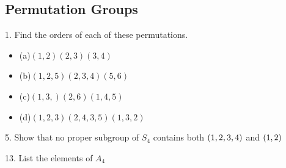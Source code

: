 \subsection{Permutation Groups}
\begin{mdframed}[style=darkQuesion]
  1. Find the orders of each of these permutations.
  \begin{itemize}
    \item []{(a)$(1,2)(2,3)(3,4)$}
    \item []{(b)$(1,2,5)(2,3,4)(5,6)$}
    \item []{(c)$(1,3,)(2,6)(1,4,5)$}
    \item []{(d)$(1,2,3)(2,4,3,5)(1,3,2)$}
  \end{itemize}
\end{mdframed}
\begin{mdframed}[style=darkAnswer,frametitle={Joe Starr}]
\end{mdframed}
\newpage
\begin{mdframed}[style=darkQuesion]
  5. Show that no proper subgroup of $S_4$ contains both $\left(1,2,3,4\right)$ and $\left(1,2\right)$
\end{mdframed}
\begin{mdframed}[style=darkAnswer,frametitle={Joe Starr}]
\end{mdframed}
\newpage
\begin{mdframed}[style=darkQuesion]
  13. List the elements of $A_4$
\end{mdframed}
